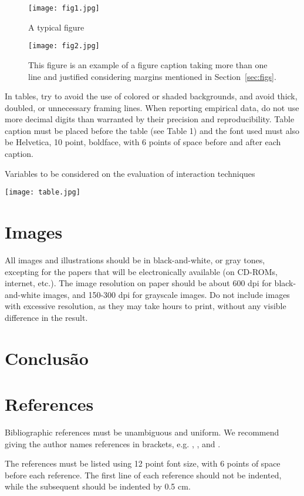 \documentclass[12pt]{article}
\begin{document}
\begin{figure}[ht]
\centering
\texttt{[image: fig1.jpg]}
\caption{A typical figure}
\label{fig:exampleFig1}
\end{figure}

\begin{figure}[ht]
\centering
\texttt{[image: fig2.jpg]}
\caption{This figure is an example of a figure caption taking more than one
  line and justified considering margins mentioned in Section~\ref{sec:figs}.}
\label{fig:exampleFig2}
\end{figure}

In tables, try to avoid the use of colored or shaded backgrounds, and avoid
thick, doubled, or unnecessary framing lines. When reporting empirical data,
do not use more decimal digits than warranted by their precision and
reproducibility. Table caption must be placed before the table (see Table 1)
and the font used must also be Helvetica, 10 point, boldface, with 6 points of
space before and after each caption.

\begin{table}[ht]
\centering
\caption{Variables to be considered on the evaluation of interaction
  techniques}
\label{tab:exTable1}
\texttt{[image: table.jpg]}
\end{table}

\section{Images}

All images and illustrations should be in black-and-white, or gray tones,
excepting for the papers that will be electronically available (on CD-ROMs,
internet, etc.). The image resolution on paper should be about 600 dpi for
black-and-white images, and 150-300 dpi for grayscale images.  Do not include
images with excessive resolution, as they may take hours to print, without any
visible difference in the result. 

\section{Conclusão}


\section{References}

Bibliographic references must be unambiguous and uniform.  We recommend giving
the author names references in brackets, e.g. \cite{knuth:84},
\cite{boulic:91}, and \cite{smith:99}.

The references must be listed using 12 point font size, with 6 points of space
before each reference. The first line of each reference should not be
indented, while the subsequent should be indented by 0.5 cm.



\end{document}
